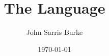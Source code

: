 \documentclass[12pt,letterpaper]{article}
\title{The \langname Language}
\date{\today}
\author{John Sarris Burke}
\begin{document}
\maketitle
\tableofcontents
\pagebreak


  \pagebreak

  \pagebreak

  \pagebreak

  \pagebreak
\end{document}
